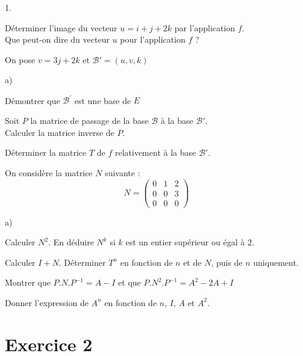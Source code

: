 \documentclass[11pt]{article}%
\begin{document}
\begin{noliste}{1.}
 \setlength{\itemsep}{4mm}
\item Déterminer l'image du vecteur $u = i + j + 2k$ par l'application
$f$.\\
Que peut-on dire du vecteur $u$ pour l'application $f$ ?

\item On pose $v = 3j + 2k$ et $\mathcal{B}{\prime } = (u,v,k)$

\begin{noliste}{a)}
 \setlength{\itemsep}{2mm}
\item Démontrer que $\mathcal{B^{\prime }}$ est une base de $E$

\item Soit $P$ la matrice de passage de la base $\mathcal{B}$ à la base
$\mathcal{B}{\prime }$.\\
Calculer la matrice inverse de $P$.

\item Déterminer la matrice $T$ de $f$ relativement à la base
$\mathcal{B}{\prime }$.
\end{noliste}

\item On considère la matrice $N$ suivante :
\[
N = \left( 
\begin{array}{rrr}
0 & 1 & 2 \\
0 & 0 & 3 \\
0 & 0 & 0
\end{array}
\right)
\]

\begin{noliste}{a)}
 \setlength{\itemsep}{2mm}
\item Calculer $N^{2}$. En déduire $N^{k}$ si $k$ est un entier
supérieur ou 
égal à $2$.

\item Calculer $I + N$. Déterminer $T^{n}$ en fonction de $n$ et de
$N$, puis
de $n$ uniquement.

\item Montrer que $P.N.P^{-1} = A-I$ et que $P.N^{2}.P^{-1} = A^{2}-2A
+ I$

\item Donner l'expression de $A^{n}$ en fonction de $n$, $I$, $A$ et
$A^{2}$.
\end{noliste}
\end{noliste}

\section*{\textbf{Exercice 2}}
\end{document}
